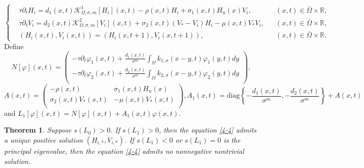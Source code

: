 \documentclass[11pt,reqno]{amsart}
\newtheorem{theorem}{Theorem}[section]
\numberwithin{equation}{section}
\begin{document}
\begin{equation}\label{4-4}
\left\{
\begin{aligned}
&\tau \partial_{t} H_{i} =d_{1}(x,t)\mathcal{K}^{1}_{\Omega,\sigma,m}[H_{i}](x,t)-\rho(x,t)H_{i}+\sigma_{1}(x,t)H_{u}(x)V_{i},&&(x,t)\in \bar\Omega\times \mathbb{R}, \\
&\tau \partial_{t} V_{i}
=d_{2}(x,t)\mathcal{K}^{2}_{\Omega,\sigma,m}[V_{i}](x,t)+\sigma_{2}(x,t)(V_{*}-V_{i})H_{i}-\mu(x,t)V_{*}V_{i},&&(x,t)\in \bar\Omega\times \mathbb{R},\\
&(H_{i}(x,t), V_{i}(x,t))=(H_{i}(x,t+1), V_{i}(x,t+1)),&&(x,t)\in \bar\Omega\times\mathbb{R}.
\end{aligned}
\right.
\end{equation}
%
%
Define
\begin{equation*}
N[\varphi](x,t) = \left(
\begin{array}{c}
-\tau\partial_{t} \varphi_{1}(x,t)  +\frac{d_{1}(x,t)}{\sigma^{m}}\int_{\Omega}k_{1,\sigma}(x-y,t)\varphi_{1}(y,t)dy  \\
-\tau\partial_{t} \varphi_{2}(x,t)  + \frac{d_{2}(x,t)}{\sigma^{m}}\int_{\Omega}k_{2,\sigma}(x-y,t)\varphi_{2}(y,t)dy   \\
\end{array}
\right),
\end{equation*}
%
\begin{equation*}
A(x,t) \!=\! \left(
\begin{array}{cc}
-\rho(x,t) &  \sigma_{1}(x,t)H_{u}(x)\\
\sigma_{2}(x,t)V_{*}(x,t) &  -\mu(x,t)V_{*}(x,t)\\
\end{array} \right)\!,
A_{1}(x,t) = \text{diag}\left\{-\frac{d_{1}(x,t)}{\sigma^{m}},  -\frac{d_{2}(x,t)}{\sigma^{m}} \right\} + A(x,t)
\end{equation*}
%
and $L_{1}[\varphi](x,t) = N[\varphi](x,t) + A_{1}(x,t)\varphi(x,t)$.
%
%
\begin{theorem}\label{T Zika 1}
Suppose $s(L_{0}) > 0$.
If $s(L_{1})>0$, then the equation \eqref{4-4} admits a unique positive solution $(H_{i,*},V_{i,*})$.
If $s(L_{1})<0$ or $s(L_{1})=0$ is the principal eigenvalue, then the equation \eqref{4-4} admits no nonnegative nontrivial solution.
\end{theorem}
%
\end{document}
